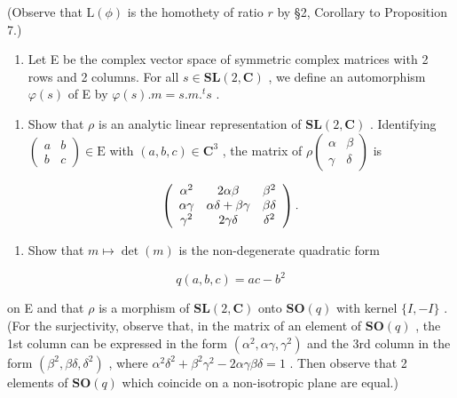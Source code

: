(Observe that \(\mathrm{L}(\phi)\) is the homothety of ratio \(r\) by §2, Corollary to Proposition 7.)

\begin{enumerate}
\def\labelenumi{\arabic{enumi}.}
\setcounter{enumi}{2}
\tightlist
\item
  Let E be the complex vector space of symmetric complex matrices with 2 rows and 2 columns. For all \(s \in \mathbf{SL}(2, \mathbf{C})\) , we define an automorphism \(\varphi(s)\) of E by \(\varphi(s).m = s.m.^t s\) .
\end{enumerate}

\begin{enumerate}
\def\labelenumi{(\alph{enumi})}
\tightlist
\item
  Show that \(\rho\) is an analytic linear representation of \(\mathbf{SL}(2, \mathbf{C})\) . Identifying \(\begin{pmatrix} a & b \\ b & c \end{pmatrix} \in \mathrm{E}\) with \((a, b, c) \in \mathbf{C}^3\) , the matrix of \(\rho\begin{pmatrix} \alpha & \beta \\ \gamma & \delta \end{pmatrix}\) is
\end{enumerate}

\[
\left( \begin{array}{c c c} \alpha^ {2} & 2 \alpha \beta & \beta^ {2} \\ \alpha \gamma & \alpha \delta + \beta \gamma & \beta \delta \\ \gamma^ {2} & 2 \gamma \delta & \delta^ {2} \end{array} \right).
\]

\begin{enumerate}
\def\labelenumi{(\alph{enumi})}
\setcounter{enumi}{1}
\tightlist
\item
  Show that \(m \mapsto \det(m)\) is the non-degenerate quadratic form
\end{enumerate}

\[
q (a, b, c) = a c - b ^ {2}
\]

on E and that \(\rho\) is a morphism of \(\mathbf{SL}(2,\mathbf{C})\) onto \(\mathbf{SO}(q)\) with kernel \(\{I, - I\}\) . (For the surjectivity, observe that, in the matrix of an element of \(\mathbf{SO}(q)\) , the 1st column can be expressed in the form \((\alpha^2,\alpha \gamma ,\gamma^2)\) and the 3rd column in the form \((\beta^2,\beta \delta ,\delta^2)\) , where \(\alpha^2\delta^2 +\beta^2\gamma^2 -2\alpha \gamma \beta \delta = 1\) . Then observe that 2 elements of \(\mathbf{SO}(q)\) which coincide on a non-isotropic plane are equal.)


